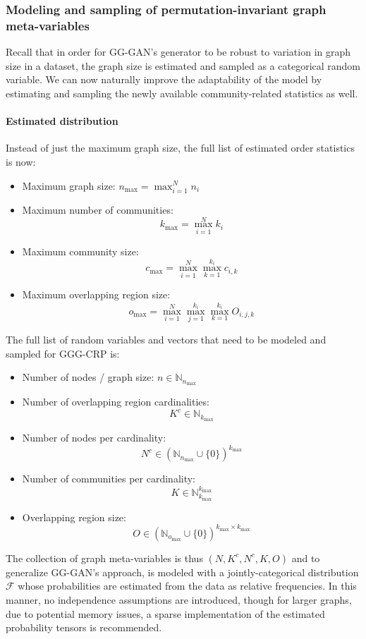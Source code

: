 \subsubsection{Modeling and sampling of permutation-invariant graph meta-variables}
Recall that in order for GG-GAN's generator to be robust to variation in graph size in a dataset, the graph size is estimated and sampled as a categorical random variable. We can now naturally improve the adaptability of the model by estimating and sampling the newly available community-related statistics as well.

\paragraph{Estimated distribution}

Instead of just the maximum graph size, the full list of estimated order statistics is now:
\begin{itemize}
\item Maximum graph size: $n_{\max}=\max_{i=1}^{N}{n_i}$
\item Maximum number of communities: $$k_{\max}=\max_{i=1}^{N}{k_i}$$
\item Maximum community size: $$c_{\max}=\max_{i=1}^{N}\max_{k=1}^{k_i}{c_{i,k}}$$
\item Maximum overlapping region size: $$o_{\max}=\max_{i=1}^{N}\max_{j=1}^{k_i}\max_{k=1}^{k_i}{O_{i,j,k}}$$
\end{itemize}

The full list of random variables and vectors that need to be modeled and sampled for GGG-CRP is:

\begin{itemize}
\item Number of nodes / graph size: $n \in \mathbb{N}_{n_{\max}}$
\item Number of overlapping region cardinalities: $$K^c \in \mathbb{N}_{k_{\max}}$$
\item Number of nodes per cardinality: $$N^c \in (\mathbb{N}_{n_{\max}} \cup \{0\})^{k_{\max}}$$
\item Number of communities per cardinality: $$K \in \mathbb{N}_{k_{\max}}^{k_{\max}}$$
\item Overlapping region size: $$O \in (\mathbb{N}_{o_{\max}} \cup \{0\})^{k_{\max} \times k_{\max}}$$
\end{itemize}

The collection of graph meta-variables is thus $(N, K^c, N^c, K, O)$ and to generalize GG-GAN's approach, is modeled with a jointly-categorical distribution $\mathcal{F}$ whose probabilities are estimated from the data as relative frequencies. In this manner, no independence assumptions are introduced, though for larger graphs, due to potential memory issues, a sparse implementation of the estimated probability tensors is recommended.

